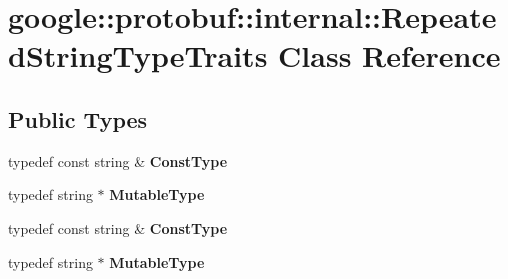 \hypertarget{classgoogle_1_1protobuf_1_1internal_1_1RepeatedStringTypeTraits}{}\section{google\+:\+:protobuf\+:\+:internal\+:\+:Repeated\+String\+Type\+Traits Class Reference}
\label{classgoogle_1_1protobuf_1_1internal_1_1RepeatedStringTypeTraits}
\subsection*{Public Types}
\begin{DoxyCompactItemize}
\item 
\mbox{\label{classgoogle_1_1protobuf_1_1internal_1_1RepeatedStringTypeTraits_a9785ef37f3333567f5f0c1eba0c47120}} 
typedef const string \& {\bfseries Const\+Type}
\item 
\mbox{\label{classgoogle_1_1protobuf_1_1internal_1_1RepeatedStringTypeTraits_a63de0a6409957e26bf1d340418937c9c}} 
typedef string $\ast$ {\bfseries Mutable\+Type}
\item 
\mbox{\label{classgoogle_1_1protobuf_1_1internal_1_1RepeatedStringTypeTraits_a9785ef37f3333567f5f0c1eba0c47120}} 
typedef const string \& {\bfseries Const\+Type}
\item 
\mbox{\label{classgoogle_1_1protobuf_1_1internal_1_1RepeatedStringTypeTraits_a63de0a6409957e26bf1d340418937c9c}} 
typedef string $\ast$ {\bfseries Mutable\+Type}
\end{DoxyCompactItemize}
